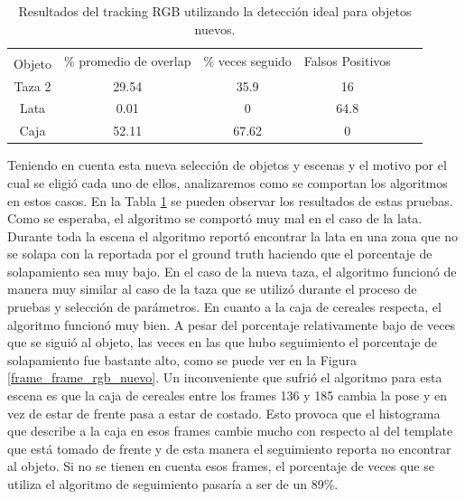 \begin{table}[h]
    \begin{tabular}{|c|c|c|c|c|c|}
    \hline
    & \multirow{2}{2.4cm}{\% promedio de overlap} & \multirow{2}{2cm}{\% veces seguido} & \multirow{2}{1.6cm}{Falsos Positivos}\\
	Objeto & & &\\
    \hline
    Taza 2  & 29.54      &  35.9             &    16 \\
    \hline
    Lata    &  0.01      &     0             &  64.8 \\
    \hline
    Caja    & 52.11      & 67.62             &     0 \\
    \hline
    \end{tabular}
\caption{Resultados del tracking RGB utilizando la detección ideal para objetos nuevos.}
\label{tabla_rgb_nuevos}
\end{table}


Teniendo en cuenta esta nueva selección de objetos y escenas y el motivo por el cual se eligió cada uno de ellos, analizaremos como se comportan los algoritmos en estos casos. En la Tabla \ref{tabla_rgb_nuevos} se pueden observar los resultados de estas pruebas. Como se esperaba, el algoritmo se comportó muy mal en el caso de la lata. Durante toda la escena el algoritmo reportó encontrar la lata en una zona que no se solapa con la reportada por el ground truth haciendo que el porcentaje de solapamiento sea muy bajo. En el caso de la nueva taza, el algoritmo funcionó de manera muy similar al caso de la taza que se utilizó durante el proceso de pruebas y selección de parámetros. En cuanto a la caja de cereales respecta, el algoritmo funcionó muy bien. A pesar del porcentaje relativamente bajo de veces que se siguió al objeto, las veces en las que hubo seguimiento el porcentaje de solapamiento fue bastante alto, como se puede ver en la Figura \ref{frame_frame_rgb_nuevo}. Un inconveniente que sufrió el algoritmo para esta escena es que la caja de cereales entre los frames 136 y 185 cambia la pose y en vez de estar de frente pasa a estar de costado. Esto provoca que el histograma que describe a la caja en esos frames cambie mucho con respecto al del template que está tomado de frente y de esta manera el seguimiento reporta no encontrar al objeto. Si no se tienen en cuenta esos frames, el porcentaje de veces que se utiliza el algoritmo de seguimiento pasaría a ser de un 89\%.

